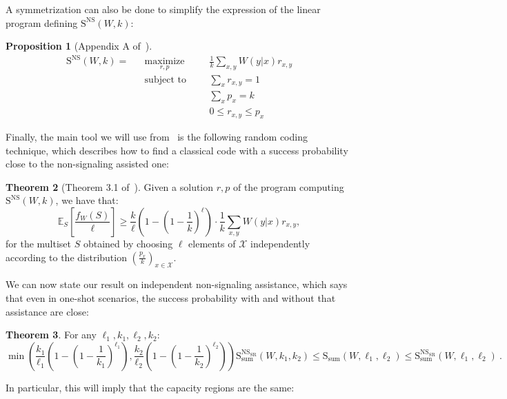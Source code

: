 \documentclass[11pt]{article}
\theoremstyle{definition}
\newtheorem{theo}{Theorem}[section]
\newtheorem{prop}[theo]{Proposition}
\theoremstyle{remark}
\DeclareMathOperator{\maxi}{\text{maximize}}
\DeclareMathOperator{\st}{\text{subject to}}
\begin{document}
A symmetrization can also be done to simplify the expression of the linear program defining $\mathrm{S}^{\mathrm{NS}}(W,k)$:

\begin{prop}[Appendix A of~\cite{BF18}]
  \label{prop:NSonewayLP}
  \begin{equation}
    \begin{aligned}
      \mathrm{S}^{\mathrm{NS}}(W,k) = &&\underset{r,p}{\maxi} &&& \frac{1}{k} \sum_{x,y} W(y|x)r_{x,y}\\
      &&\st &&& \sum_{x} r_{x,y} = 1\\
      &&&&& \sum_{x} p_{x} = k\\
      &&&&& 0 \leq r_{x,y} \leq p_{x}
    \end{aligned}
  \end{equation}
\end{prop}

Finally, the main tool we will use from~\cite{BF18} is the following random coding technique, which describes how to find a classical code with a success probability close to the non-signaling assisted one:
\begin{theo}[Theorem 3.1 of~\cite{BF18}]
  \label{theo:RandomCoding}
  Given a solution $r,p$ of the program computing $\mathrm{S}^{\mathrm{NS}}(W,k)$, we have that:
  \[ \mathbb{E}_S\left[\frac{f_W(S)}{\ell}\right] \geq \frac{k}{\ell}\left(1-\left(1-\frac{1}{k}\right)^{\ell}\right) \cdot \frac{1}{k} \sum_{x,y} W(y|x)r_{x,y} , \]
  for the multiset $S$ obtained by choosing $\ell$ elements of $\mathcal{X}$ independently according to the distribution $\left(\frac{p_{x}}{k}\right)_{x \in \mathcal{X}}$.
\end{theo}

We can now state our result on independent non-signaling assistance, which says that even in one-shot scenarios, the success probability with and without that assistance are close:

\begin{theo}
  \label{theo:NSsr}
  For any $\ell_1,k_1,\ell_2,k_2$:
  \[ \min\left(\frac{k_1}{\ell_1}\left(1-\left(1-\frac{1}{k_1}\right)^{\ell_1}\right),\frac{k_2}{\ell_2}\left(1-\left(1-\frac{1}{k_2}\right)^{\ell_2}\right)\right)\mathrm{S}_{\text{sum}}^{\mathrm{NS}_{\mathrm{SR}}}(W,k_1,k_2) \leq \mathrm{S}_{\text{sum}}(W,\ell_1,\ell_2) \leq \mathrm{S}_{\text{sum}}^{\mathrm{NS}_{\mathrm{SR}}}(W,\ell_1,\ell_2)\ . \]
\end{theo}

In particular, this will imply that the capacity regions are the same:
\end{document}
